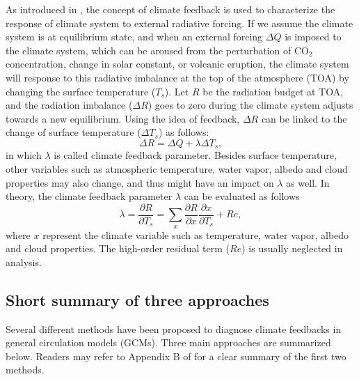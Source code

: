 As introduced in , 
the concept of climate feedback is used to characterize the response of climate system to external radiative forcing. If we assume the climate system is at equilibrium state, and when an external forcing $\Delta Q$ is imposed to the climate system, which can be aroused from the perturbation of CO$_2$ concentration, change in solar constant, or volcanic eruption, the climate system will response to this radiative imbalance at the top of the atmosphere (TOA) by changing the surface temperature ($T_s$). Let $R$ be the radiation budget at TOA, and the radiation imbalance ($\Delta R$) goes to zero during the climate system adjusts towards a new equilibrium. Using the idea of feedback, $\Delta R$ can be linked to the change of surface temperature ($\Delta T_s$) as follows:
\begin{equation}
    \Delta R = \Delta Q + \lambda \Delta T_s,
    \label{eq:imbalance_forcing_lambda}
\end{equation}
in which $\lambda$ is called climate feedback parameter. Besides surface temperature, other variables such as atmospheric temperature, water vapor, albedo and cloud properties may also change, and thus might have an impact on $\lambda$ as well. In theory, the climate feedback parameter $\lambda$ can be evaluated as follows
\begin{equation}
    \lambda = \frac{\partial R}{\partial T_s} = \sum_x \frac{\partial R}{\partial x}\frac{\partial x}{\partial T_s}  + Re, %
    \label{eq:lambda}
\end{equation}
where $x$ represent the climate variable such as temperature, water vapor, albedo and cloud properties. The high-order residual term ($Re$) is usually neglected in analysis.

\subsection{Short summary of three approaches}
\label{sec:three_climate_fbk_methods}

Several different methods have been proposed to diagnose climate feedbacks in general circulation models (GCMs). Three main approaches are summarized below. Readers may refer to Appendix B of \cite{Bony2006} for a clear summary of the first two methods.%

